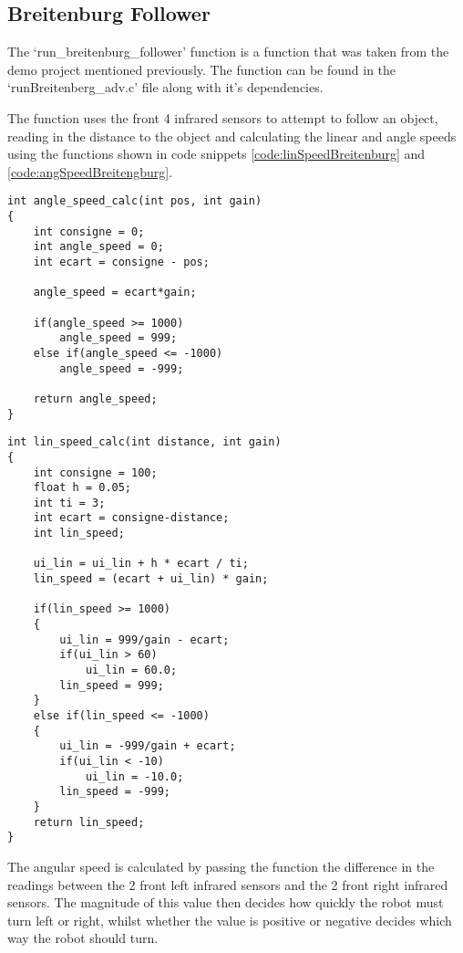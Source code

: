\subsection{Breitenburg Follower}
The `run\_breitenburg\_follower' function is a function that was taken from the demo project mentioned previously. The function can be found in the `runBreitenberg\_adv.c' file along with it's dependencies.

The function uses the front 4 infrared sensors to attempt to follow an object, reading in the distance to the object and calculating the linear and angle speeds using the functions shown in code snippets \ref{code:linSpeedBreitenburg} and \ref{code:angSpeedBreitengburg}.

\vspace{5mm}
\begin{lstlisting}[caption={Functions for calculating the angular speed of the E-Puck},label=code:angSpeedBreitengburg]
int angle_speed_calc(int pos, int gain)
{
	int consigne = 0;
	int angle_speed = 0;
	int ecart = consigne - pos;

	angle_speed = ecart*gain;

	if(angle_speed >= 1000)
		angle_speed = 999;
	else if(angle_speed <= -1000)
		angle_speed = -999;

	return angle_speed;
}
\end{lstlisting}

\begin{lstlisting}[caption={Functions for calculating the linear speed of the E-Puck},label=code:linSpeedBreitenburg, float]
int lin_speed_calc(int distance, int gain)
{
	int consigne = 100;
	float h = 0.05;
	int ti = 3;
	int ecart = consigne-distance;
	int lin_speed;

	ui_lin = ui_lin + h * ecart / ti;
	lin_speed = (ecart + ui_lin) * gain;

	if(lin_speed >= 1000)
	{
		ui_lin = 999/gain - ecart;
		if(ui_lin > 60)	
			ui_lin = 60.0;
		lin_speed = 999;
	}
	else if(lin_speed <= -1000)
	{
		ui_lin = -999/gain + ecart;
		if(ui_lin < -10)
			ui_lin = -10.0;
		lin_speed = -999;
	}
	return lin_speed;
}
\end{lstlisting}

The angular speed is calculated by passing the function the difference in the readings between the 2 front left infrared sensors and the 2 front right infrared sensors. The magnitude of this value then decides how quickly the robot must turn left or right, whilst whether the value is positive or negative decides which way the robot should turn. 

